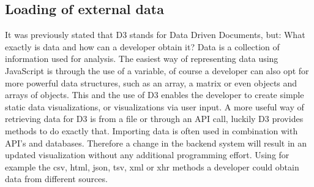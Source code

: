 \documentclass{bioinfo}
\begin{document}
\subsection{Loading of external data}
It was previously stated that D3 stands for Data Driven Documents, but: What exactly is data and how can a developer obtain it? Data is a collection of information used for analysis. The easiest way of representing data using JavaScript is through the use of a variable, of course a developer can also opt for more powerful data structures, such as an array, a matrix or even objects and arrays of objects. This and the use of D3 enables the developer to create simple static data visualizations, or visualizations via user input. A more useful way of retrieving  data for D3 is from a file or through an API call, luckily D3 provides methods to do exactly that.
Importing data is often used in combination with API's and databases. Therefore a change in the backend system will result in an updated visualization without any additional programming effort.
Using for example the csv, html, json, tsv, xml or xhr methods a developer could obtain data from different sources.
\end{document}
